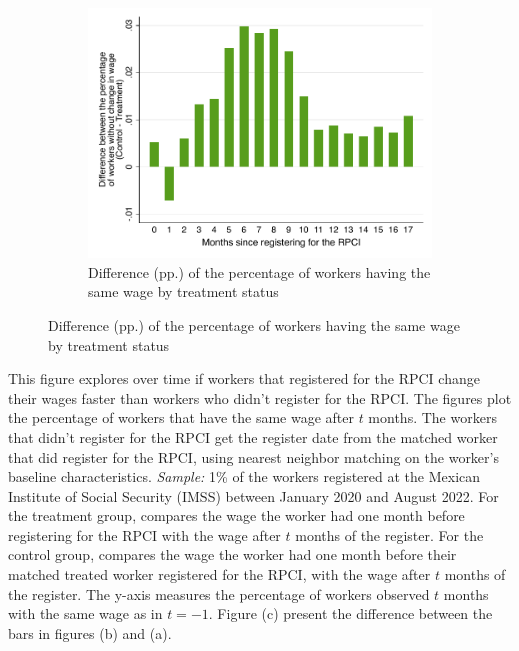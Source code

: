 \documentclass[oneside,11pt]{article}
\begin{document}
\begin{figure}[H]
\begin{center}
    \begin{subfigure}{0.49\textwidth}
    \caption{Difference (pp.) of the percentage of workers having the same wage by treatment status}
    \includegraphics[width=\textwidth]{04_Figures/muestra_1porciento/hist_wage_time_since_treated_diff_matched.pdf}
    \end{subfigure}
    
    \end{center}
\end{figure}
\scriptsize{
\noindent This figure explores over time if workers that registered for the RPCI change their wages faster than workers who didn't register for the RPCI. The figures plot the percentage of workers that have the same wage after $t$ months. The workers that didn't register for the RPCI get the register date from the matched worker that did register for the RPCI, using nearest neighbor matching on the worker's baseline characteristics. \textit{Sample:} 1\% of the workers registered at the Mexican Institute of Social Security (IMSS) between January 2020 and August 2022. For the treatment group, compares the wage the worker had one month before registering for the RPCI with the wage after $t$ months of the register. For the control group, compares the wage the worker had one month before their matched treated worker registered for the RPCI, with the wage after $t$ months of the register. The y-axis measures the percentage of workers observed $t$ months with the same wage as in $t = -1$. Figure (c) present the difference between the bars in figures (b) and (a).
}


\clearpage
\end{document}
